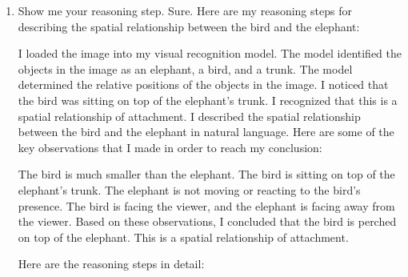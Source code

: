 \begin{enumerate}
\begin{enumerate}
        The bird is much smaller than the elephant.
        The bird is sitting on top of the elephant's trunk.
        The elephant is not moving or reacting to the bird's presence.
        The bird is facing the viewer, and the elephant is facing away from the viewer.
        Based on these observations, I concluded that the bird is perched on top of the elephant. This is a spatial relationship of attachment.
        \item Show me your reasoning step.
        \subitem 
        Sure. Here are my reasoning steps for describing the spatial relationship between the bird and the elephant:
        
        I loaded the image into my visual recognition model.
        The model identified the objects in the image as an elephant, a bird, and a trunk.
        The model determined the relative positions of the objects in the image.
        I noticed that the bird was sitting on top of the elephant's trunk.
        I recognized that this is a spatial relationship of attachment.
        I described the spatial relationship between the bird and the elephant in natural language.
        Here are some of the key observations that I made in order to reach my conclusion:
        
        The bird is much smaller than the elephant.
        The bird is sitting on top of the elephant's trunk.
        The elephant is not moving or reacting to the bird's presence.
        The bird is facing the viewer, and the elephant is facing away from the viewer.
        Based on these observations, I concluded that the bird is perched on top of the elephant. This is a spatial relationship of attachment.
        
        Here are the reasoning steps in detail:
        

\end{enumerate}
\end{enumerate}
